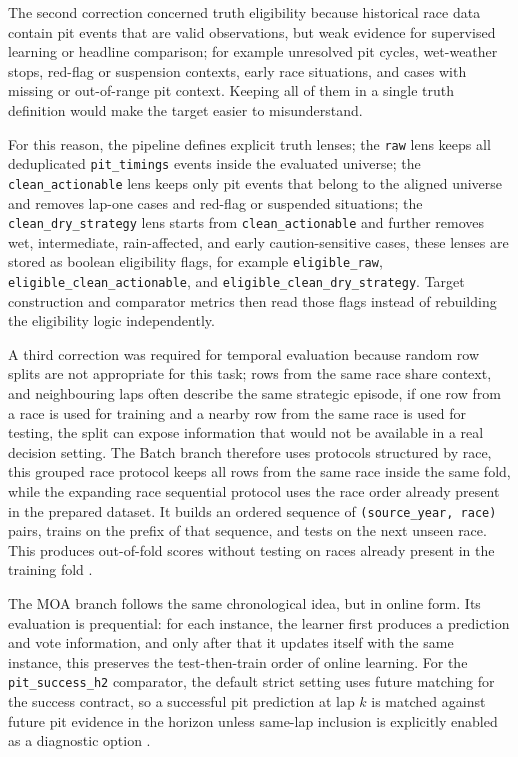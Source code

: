 The second correction concerned truth eligibility because historical race data contain pit events that are valid observations, but weak evidence for supervised learning or headline
comparison; for example unresolved pit cycles, wet-weather stops, red-flag or suspension contexts, early race situations, and cases with missing or out-of-range pit context.
Keeping all of them in a single truth definition would make the target easier to misunderstand.

For this reason, the pipeline defines explicit truth lenses; the \texttt{raw} lens keeps all deduplicated \texttt{pit\_timings} events inside the evaluated universe;
the \texttt{clean\_actionable} lens keeps only pit events that belong to the aligned universe and removes lap-one cases and red-flag or suspended situations;
the \texttt{clean\_dry\_strategy} lens starts from \texttt{clean\_actionable} and further removes wet, intermediate, rain-affected, and early caution-sensitive cases,
these lenses are stored as boolean eligibility flags, for example \texttt{eligible\_raw}, \texttt{eligible\_clean\_actionable}, and \texttt{eligible\_clean\_dry\_strategy}.
Target construction and comparator metrics then read those flags instead of rebuilding the eligibility logic independently.

A third correction was required for temporal evaluation because random row splits are not appropriate for this task; rows from the same race share context, and neighbouring laps often
describe the same strategic episode, if one row from a race is used for training and a nearby row from the same race is used for testing, the split can expose information that
would not be available in a real decision setting. The Batch branch therefore uses protocols structured by race, this grouped race protocol keeps all rows from the same race inside
the same fold, while the expanding race sequential protocol uses the race order already present in the prepared dataset. It builds an ordered sequence of \texttt{(source\_year, race)}
pairs, trains on the prefix of that sequence, and tests on the next unseen race.
This produces out-of-fold scores without testing on races already present in the training fold \cite{roberts2017cvstructured}.

The MOA branch follows the same chronological idea, but in online form. Its evaluation is prequential: for each instance, the learner first produces a prediction and vote information,
and only after that it updates itself with the same instance, this preserves the test-then-train order of online learning. For the \texttt{pit\_success\_h2} comparator, the default
strict setting uses future matching for the success contract, so a successful pit prediction at lap $k$ is matched against future pit evidence in the horizon unless same-lap
inclusion is explicitly enabled as a diagnostic option \cite{bifet2010moa,oza2005boosting}.

